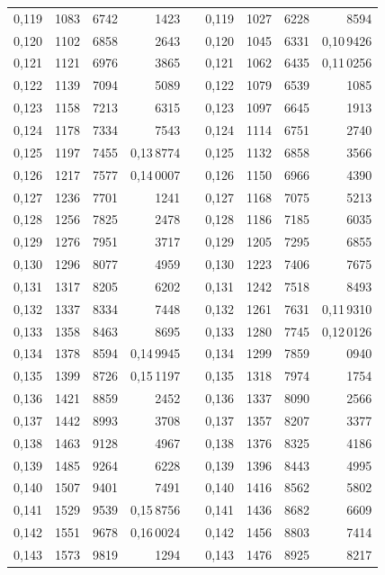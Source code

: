 \begin{tabular}{|c|c|c|r|@{}p{9pt}@{}|c|c|c|r|}
0,119 & 1083 & 6742 & 1423 &  & 0,119 & 1027 & 6228 & 8594 \\
0,120 & 1102 & 6858 & 2643 &  & 0,120 & 1045 & 6331 & 0,10\,9426 \\[3pt]
0,121 & 1121 & 6976 & 3865 &  & 0,121 & 1062 & 6435 & 0,11\,0256 \\
0,122 & 1139 & 7094 & 5089 &  & 0,122 & 1079 & 6539 & 1085 \\
0,123 & 1158 & 7213 & 6315 &  & 0,123 & 1097 & 6645 & 1913 \\
0,124 & 1178 & 7334 & 7543 &  & 0,124 & 1114 & 6751 & 2740 \\
0,125 & 1197 & 7455 & 0,13\,8774 &  & 0,125 & 1132 & 6858 & 3566 \\[3pt]
0,126 & 1217 & 7577 & 0,14\,0007 &  & 0,126 & 1150 & 6966 & 4390 \\
0,127 & 1236 & 7701 & 1241 &  & 0,127 & 1168 & 7075 & 5213 \\
0,128 & 1256 & 7825 & 2478 &  & 0,128 & 1186 & 7185 & 6035 \\
0,129 & 1276 & 7951 & 3717 &  & 0,129 & 1205 & 7295 & 6855 \\
0,130 & 1296 & 8077 & 4959 &  & 0,130 & 1223 & 7406 & 7675 \\[3pt]
0,131 & 1317 & 8205 & 6202 &  & 0,131 & 1242 & 7518 & 8493 \\
0,132 & 1337 & 8334 & 7448 &  & 0,132 & 1261 & 7631 & 0,11\,9310 \\
0,133 & 1358 & 8463 & 8695 &  & 0,133 & 1280 & 7745 & 0,12\,0126 \\
0,134 & 1378 & 8594 & 0,14\,9945 &  & 0,134 & 1299 & 7859 & 0940 \\
0,135 & 1399 & 8726 & 0,15\,1197 &  & 0,135 & 1318 & 7974 & 1754 \\[3pt]
0,136 & 1421 & 8859 & 2452 &  & 0,136 & 1337 & 8090 & 2566 \\
0,137 & 1442 & 8993 & 3708 &  & 0,137 & 1357 & 8207 & 3377 \\
0,138 & 1463 & 9128 & 4967 &  & 0,138 & 1376 & 8325 & 4186 \\
0,139 & 1485 & 9264 & 6228 &  & 0,139 & 1396 & 8443 & 4995 \\
0,140 & 1507 & 9401 & 7491 &  & 0,140 & 1416 & 8562 & 5802 \\[3pt]
0,141 & 1529 & 9539 & 0,15\,8756 &  & 0,141 & 1436 & 8682 & 6609 \\
0,142 & 1551 & 9678 & 0,16\,0024 &  & 0,142 & 1456 & 8803 & 7414 \\
0,143 & 1573 & 9819 & 1294 &  & 0,143 & 1476 & 8925 & 8217 \\

\end{tabular}
